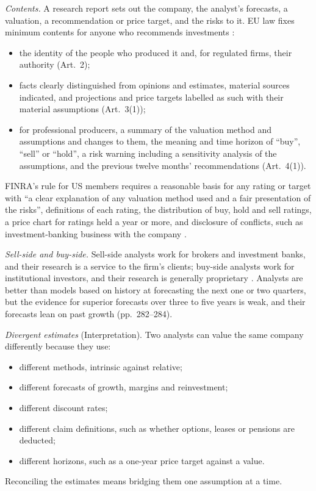 \begin{qfdefinition}\label{def:research-report-evaluation}
 \emph{Contents.} A research report sets out the company, the analyst's forecasts, a valuation, a recommendation or price target, and the risks to it. EU law fixes minimum contents for anyone who recommends investments \citep[Arts.~2--4]{eu-2016-958-recommendations}:
\begin{itemize}
\item the identity of the people who produced it and, for regulated firms, their authority (Art.~2);
\item facts clearly distinguished from opinions and estimates, material sources indicated, and projections and price targets labelled as such with their material assumptions (Art.~3(1));
\item for professional producers, a summary of the valuation method and assumptions and changes to them, the meaning and time horizon of ``buy'', ``sell'' or ``hold'', a risk warning including a sensitivity analysis of the assumptions, and the previous twelve months' recommendations (Art.~4(1)).
\end{itemize}
FINRA's rule for US members requires a reasonable basis for any rating or target with ``a clear explanation of any valuation method used and a fair presentation of the risks'', definitions of each rating, the distribution of buy, hold and sell ratings, a price chart for ratings held a year or more, and disclosure of conflicts, such as investment-banking business with the company \citep[para.~(c)(1)--(4)]{finra-rule-2241}.

\emph{Sell-side and buy-side.} Sell-side analysts work for brokers and investment banks, and their research is a service to the firm's clients; buy-side analysts work for institutional investors, and their research is generally proprietary \citep[p.~283 n.~5]{investment-valuation-2012}. Analysts are better than models based on history at forecasting the next one or two quarters, but the evidence for superior forecasts over three to five years is weak, and their forecasts lean on past growth (pp.~282--284).

\emph{Divergent estimates} (Interpretation). Two analysts can value the same company differently because they use:
\begin{itemize}
\item different methods, intrinsic against relative;
\item different forecasts of growth, margins and reinvestment;
\item different discount rates;
\item different claim definitions, such as whether options, leases or pensions are deducted;
\item different horizons, such as a one-year price target against a value.
\end{itemize}
Reconciling the estimates means bridging them one assumption at a time.


\end{qfdefinition}
